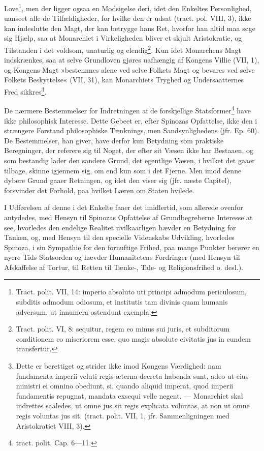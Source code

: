 \documentclass[12pt,a4paper]{book}
\newcommand{\opage}[1]{\marginnote{\footnotesize\textit{[#1]}}}
\begin{document}
\opage{145} \setcounter{footnote}{0}%
Love\footnote{Tract. polit. VII, 14: imperio absoluto uti principi admodum periculosum, subditis admodum odiosum, et institutis tam divinis quam humanis adversum, ut innumera ostendunt exempla.}, men der ligger ogsaa en Modsigelse deri, idet den Enkeltes Personlighed, uanseet alle de Tilfældigheder, for hvilke den er udsat (tract. pol. VIII, 3), ikke kan indeslutte den Magt, der kan betrygge hans Ret, hvorfor han altid maa søge sig Hjælp, saa at Monarchiet i Virkeligheden bliver et skjult Aristokratie, og Tilstanden i det voldsom, unaturlig og elendig\footnote{Tract. polit. VI, 8: sequitur, regem eo minus sui juris, et subditorum conditionem eo miseriorem esse, quo magis absolute civitatis jus in eundem transfertur.}. Kun idet Monarchens Magt indskrænkes, saa at selve Grundloven gjøres uafhængig af Kongens Villie (VII, 1), og Kongens Magt »bestemmes alene ved selve Folkets Magt og bevares ved selve Folkets Beskyttelse« (VII, 31), kan Monarchiets Tryghed og Undersaatternes Fred sikkres\footnote{Dette er berettiget og strider ikke imod Kongens Værdighed: nam fundamenta imperii veluti regis æterna decreta habenda sunt, adeo ut eius ministri ei omnino obediunt, si, quando aliquid imperat, quod imperii fundamentis repugnat, mandata exsequi velle negent. --- Monarchiet skal indrettes saaledes, ut omne jus sit regis explicata voluntas, at non ut omne regis voluntas jus sit. (tract. polit. VII, 1, jfr. Sammenligningen med Aristokratiet VIII, 3).}.

De nærmere Bestemmelser for Indretningen af de forskjellige Statsformer\footnote{tract. polit. Cap. 6---11.} have ikke philosophisk Interesse. Dette Gebeet er, efter Spinozas Opfattelse, ikke den i strængere Forstand philosophiske Tænknings, men Sandsynlighedens (jfr. Ep. 60). De Bestemmelser, han giver, have derfor kun Betydning som praktiske Beregninger, der referere sig til Noget, der efter sit Væsen ikke har Bestaaen, og som bestandig lader den sandere Grund, det egentlige Væsen, i hvilket det gaaer tilbage, skinne igjennem sig, om end kun som i det Fjerne. Men imod denne dybere Grund gaaer Retningen, og idet den viser sig (jfr. næste Capitel), forsvinder det Forhold, paa hvilket Læren om Staten hvilede.

\opage{146} %
\setcounter{footnote}{0}%
I Udførelsen af denne i det Enkelte faaer det imidlertid, som allerede ovenfor antydedes, med Hensyn til Spinozas Opfattelse af Grundbegreberne Interesse at see, hvorledes den endelige Realitet uvilkaarligen hævder en Betydning for Tanken, og, med Hensyn til den specielle Videnskabs Udvikling, hvorledes Spinoza, i sin Sympathie for den fornuftige Frihed, paa mange Punkter berører en nyere Tids Statsorden og hævder Humanitetens Fordringer (med Hensyn til Afskaffelse af Tortur, til Retten til Tænke-, Tale- og Religionsfrihed o. desl.).
\end{document}
